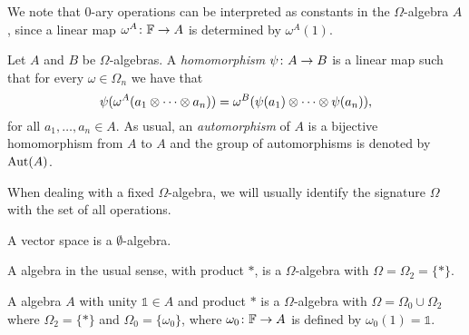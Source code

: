 We note that $0$-ary operations can be interpreted as constants in the $\Omega$-algebra $A$, since a linear map $\omega^A\colon \mathbb{F} \to A$ is determined by $\omega^A(1)$.

\begin{defi}
    Let $A$ and $B$ be $\Omega$-algebras. 
    A \emph{homomorphism} $\psi\colon A \to B$ is a linear map such that for every $\omega \in \Omega_n$ we have that
    \[
        \psi( \omega^A (a_1 \otimes \cdots \otimes a_n) ) = \omega^B ( \psi(a_1) \otimes \cdots \otimes \psi(a_n) ),
    \]
    for all $a_1, \ldots, a_n \in A$. 
    As usual, an \emph{automorphism} of $A$ is a bijective homomorphism from $A$ to $A$ and the group of automorphisms is denoted by $\operatorname{Aut}(A)$.
\end{defi}

When dealing with a fixed $\Omega$-algebra, we will usually identify the signature $\Omega$ with the set of all operations.

\begin{ex}\label{ex:omega-vec-space}
    A vector space is a $\emptyset$-algebra.
\end{ex}

\begin{ex}\label{ex:omega-algebra}
    A algebra in the usual sense, with product $*$, is a $\Omega$-algebra with $\Omega = \Omega_2 = \{ * \}$. 
\end{ex}

\begin{ex}
    A algebra $A$ with unity $\mathds{1} \in A$ and product $*$ is a  $\Omega$-algebra with $\Omega = \Omega_0 \cup \Omega_2$ where $\Omega_2 = \{ * \}$ and $\Omega_0 = \{ \omega_0 \}$, where $\omega_0\colon \mathbb{F} \to A$ is defined by $\omega_0 (1) = \mathds 1$.
\end{ex}


